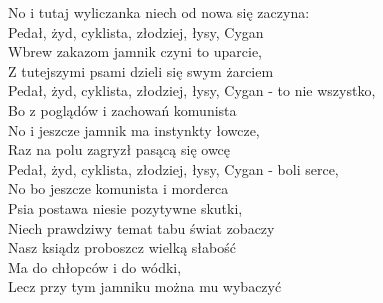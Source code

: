 No i tutaj wyliczanka niech od nowa się zaczyna: \\
Pedał, żyd, cyklista, złodziej, łysy, Cygan \\
\hops
Wbrew zakazom jamnik czyni to uparcie, \\
Z tutejszymi psami dzieli się swym żarciem \\
Pedał, żyd, cyklista, złodziej, łysy, Cygan - to nie wszystko, \\
Bo z poglądów i zachowań komunista \\
\hops
No i jeszcze jamnik ma instynkty łowcze, \\
Raz na polu zagryzł pasącą się owcę \\
Pedał, żyd, cyklista, złodziej, łysy, Cygan - boli serce, \\
No bo jeszcze komunista i morderca \\
\hops
Psia postawa niesie pozytywne skutki, \\
Niech prawdziwy temat tabu świat zobaczy \\
Nasz ksiądz proboszcz wielką słabość \\
Ma do chłopców i do wódki, \\
Lecz przy tym jamniku można mu wybaczyć